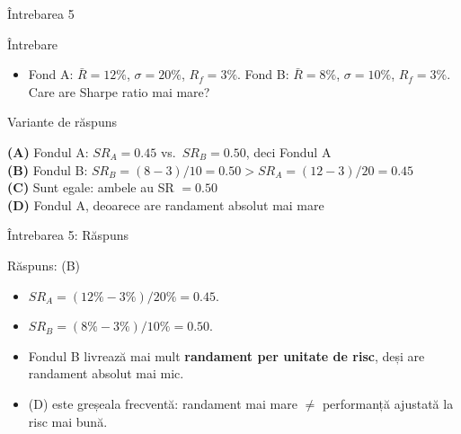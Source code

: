\documentclass[9pt, aspectratio=169, t]{beamer}
\theoremstyle{definition}
\newenvironment{cminipage}[1]{%
    \par\noindent\hfill\begin{minipage}{#1}\ignorespaces
}{%
    \end{minipage}\hfill\null\par
}
\begin{document}
\begin{frame}{Întrebarea 5}
    \begin{cminipage}{0.95\textwidth}
    \begin{alertblock}{Întrebare}
        \begin{itemize}
            \item Fond A: $\bar{R}=12\%$, $\sigma=20\%$, $R_f=3\%$. Fond B: $\bar{R}=8\%$, $\sigma=10\%$, $R_f=3\%$. Care are Sharpe ratio mai mare?
        \end{itemize}
    \end{alertblock}

    \vspace{0.3cm}

    \begin{block}{Variante de răspuns}

        \textcolor{MainBlue}{\textbf{(A)}} Fondul A: $SR_A = 0.45$ vs.\ $SR_B = 0.50$, deci Fondul A\\[3pt]

        \textcolor{MainBlue}{\textbf{(B)}} Fondul B: $SR_B = (8-3)/10 = 0.50 > SR_A = (12-3)/20 = 0.45$\\[3pt]

        \textcolor{MainBlue}{\textbf{(C)}} Sunt egale: ambele au SR $= 0.50$\\[3pt]

        \textcolor{MainBlue}{\textbf{(D)}} Fondul A, deoarece are randament absolut mai mare

    \end{block}
    \end{cminipage}
\end{frame}

\begin{frame}{Întrebarea 5: Răspuns}
    \begin{cminipage}{0.95\textwidth}
    \begin{exampleblock}{Răspuns: (B)}
    \begin{itemize}
        \item $SR_A = (12\% - 3\%) / 20\% = 0.45$.
        \item $SR_B = (8\% - 3\%) / 10\% = 0.50$.
        \item Fondul B livrează mai mult \textbf{randament per unitate de risc}, deși are randament absolut mai mic.
        \item (D) este greșeala frecventă: randament mai mare $\neq$ performanță ajustată la risc mai bună.
    \end{itemize}
    \end{exampleblock}
    \end{cminipage}
\end{frame}
\end{document}
